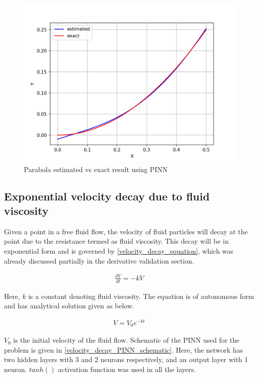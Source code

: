 \begin{figure}
   \center
    \includegraphics[scale=0.7]{supportingFiles/02_results/04_parabola_PINN/estimation.png}
    \caption{Parabola estimated vs exact result using PINN}
    \label{parabola_PINN_result}
\end{figure}

\subsection{Exponential velocity decay due to fluid viscosity}
\par{}
Given a point in a free fluid flow, the velocity of fluid particles will decay
at the point due to the resistance termed as fluid viscosity. This decay
will be in exponential form and is governed by \cref{velocity_decay_equation},
which was already discussed partially in the derivative validation section.

\begin{align}
    \frac{d V}{d t} = -k V \label{velocity_decay_equation}
\end{align}

Here, \(k\) is a constant denoting fluid viscosity.
The equation is of autonomous form and has analytical solution given as below.

\begin{align*}
    V = V_0 e^{-k t}
\end{align*}

\(V_0\) is the initial velocity of the fluid flow. Schematic of the PINN used
for the problem is given in \cref{velocity_decay_PINN_schematic}. Here, the
network has two hidden layers with 3 and 2 neurons respectively, and an
output layer with 1 neuron. \(tanh()\) activation function was used in all
the layers.\\

